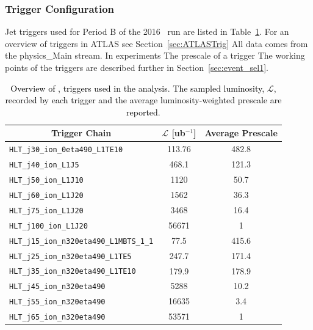 \subsubsection{Trigger Configuration}

Jet triggers used for Period B of the 2016 \pxPb\ run are listed in Table~\ref{tab:trigger_overview_pPb}.
For an overview of triggers in ATLAS see Section~\ref{sec:ATLASTrig}
All data comes from the physics\_Main stream.
In experiments The prescale of a trigger
The working points of the triggers are described further in Section~\ref{sec:event_sel1}.


\begin{table}[!ht]
    \centering
    \begin{tabular}{ | c | c | c |}
        \hline
        \textbf{Trigger Chain}   & \textbf{$\mathscr{L}$ [ub$^{-1}$]} & \textbf{Average Prescale} \\
        \hline
        \multicolumn{1}{|l|}{\texttt{HLT\_j30\_ion\_0eta490\_L1TE10}}            & 113.76 & 482.8\\ \hline
        \multicolumn{1}{|l|}{\texttt{HLT\_j40\_ion\_L1J5}}                       & 468.1  & 121.3\\ \hline
        \multicolumn{1}{|l|}{\texttt{HLT\_j50\_ion\_L1J10}}                      & 1120   & 50.7\\ \hline
        \multicolumn{1}{|l|}{\texttt{HLT\_j60\_ion\_L1J20}}                      & 1562   & 36.3\\ \hline
        \multicolumn{1}{|l|}{\texttt{HLT\_j75\_ion\_L1J20}}                      & 3468   & 16.4\\ \hline
        \multicolumn{1}{|l|}{\texttt{HLT\_j100\_ion\_L1J20}}                     & 56671  & 1\\ \hline
        \multicolumn{1}{|l|}{\texttt{HLT\_j15\_ion\_n320eta490\_L1MBTS\_1\_1}}   & 77.5   & 415.6\\ \hline
        \multicolumn{1}{|l|}{\texttt{HLT\_j25\_ion\_n320eta490\_L1TE5}}          & 247.7  & 171.4\\ \hline
        \multicolumn{1}{|l|}{\texttt{HLT\_j35\_ion\_n320eta490\_L1TE10}}         & 179.9  & 178.9\\ \hline
        \multicolumn{1}{|l|}{\texttt{HLT\_j45\_ion\_n320eta490}}                 & 5288   & 10.2\\ \hline
        \multicolumn{1}{|l|}{\texttt{HLT\_j55\_ion\_n320eta490}}                 & 16635  & 3.4\\ \hline
        \multicolumn{1}{|l|}{\texttt{HLT\_j65\_ion\_n320eta490}}                 & 53571  & 1\\ \hline

    \end{tabular}
    \vspace{2mm}
    \caption{
        \textcolor{black}{
            Overview of \pxPb, triggers used in the analysis. The sampled luminosity, $\mathscr{L}$, recorded by each trigger and the average luminosity-weighted prescale are reported.
        }
    }
    \label{tab:trigger_overview_pPb}
\end{table}

